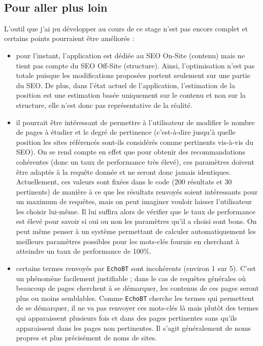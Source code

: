 \documentclass[12pt]{article}
\begin{document}
\

\subsection{Pour aller plus loin}

L'outil que j'ai pu développer au cours de ce stage n'est pas encore complet et certains points pourraient être améliorés  :
\begin{itemize}
	\item pour l'instant, l'application est dédiée au SEO On-Site (contenu) mais ne tient pas compte du SEO Off-Site (structure). Ainsi, l'optimisation n'est pas totale puisque les modifications proposées portent seulement sur une partie du SEO. De plus, dans l'état actuel de l'application, l'estimation de la position est une estimation basée uniquement sur le contenu et non sur la structure, elle n'est donc pas représentative de la réalité.
	\item il pourrait être intéressant de permettre à l'utilisateur de modifier le nombre de pages à étudier et le degré de pertinence (c'est-à-dire jusqu'à quelle position les sites référencés sont-ils considérés comme pertinents vis-à-vis du SEO). On se rend compte en effet que pour obtenir des recommandations cohérentes (donc un taux de performance très élevé), ces paramètres doivent être adaptés à la requête donnée et ne seront donc jamais identiques. Actuellement, ces valeurs sont fixées dans le code (200 résultats et 30 pertinents) de manière à ce que les résultats renvoyés soient intéressants pour un maximum de requêtes, mais on peut imaginer vouloir laisser l'utilisateur les choisir lui-même. Il lui suffira alors de vérifier que le taux de performance est élevé pour savoir si oui ou non les paramètres qu'il a choisi sont bons. On peut même penser à un système permettant de calculer automatiquement les meilleurs paramètres possibles pour les mots-clés fournis en cherchant à atteindre un taux de performance de 100\%.
	\item certains termes renvoyés par \texttt{EchoBT} sont incohérents (environ 1 sur 5). C'est un phénomène facilement justifiable ; dans le cas de requêtes générales où beaucoup de pages cherchent à se démarquer, les contenus de ces pages seront plus ou moins semblables. Comme \texttt{EchoBT} cherche les termes qui permettent de se démarquer, il ne va pas renvoyer ces mots-clés là mais plutôt des termes qui apparaissent plusieurs fois et dans des pages pertinentes sans qu'ils apparaissent dans les pages non pertinentes. Il s'agit généralement de noms propres et plus précisément de noms de sites.
	

\end{itemize}
\end{document}
